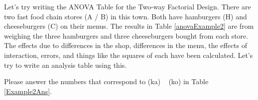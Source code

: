 \documentclass{ltjbook}
\begin{document}
Let's try writing the ANOVA Table for the Two-way Factorial Design.
There are two fast food chain stores (A / B) in this town. Both have hamburgers (H) and cheeseburgers (C) on their menus.
The results in Table \ref{anovaExample2} are from weighing the three hamburgers and three cheeseburgers bought from each store.
The effects due to differences in the shop, differences in the menu, the effects of interaction, errors, and things like the squares of each have been calculated.
Let's try to write an analysis table using this.


Please answer the numbers that correspond to (ka) ~ (ko) in Table \ref {Example2Ans}.


\end{document}
